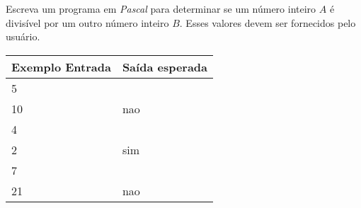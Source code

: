 \item Escreva um programa em \emph{Pascal} para determinar se um número 
inteiro $A$ é divisível por um outro número inteiro $B$. Esses valores 
devem ser fornecidos pelo usuário.

\begin{center}
\begin{tabular}{|l|l|} \hline
Exemplo Entrada & Saída esperada \\ \hline
5                &                \\
10               & nao               \\ \hline
4                &                \\ 
2                & sim               \\ \hline
7                &                \\ 
21               & nao              \\ \hline
\end{tabular}
\end{center}